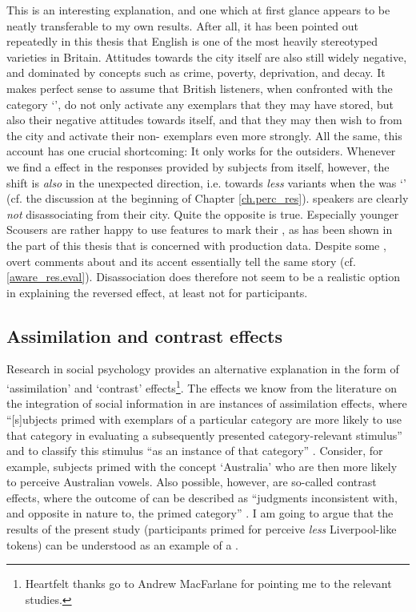 This is an interesting explanation, and one which at first glance appears to be neatly transferable to my own results.
After all, it has been pointed out repeatedly in this thesis that  English is one of the most heavily stereotyped varieties in Britain.
Attitudes towards the city itself are also still widely negative, and dominated by concepts such as crime, poverty, deprivation, and decay.
It makes perfect sense to assume that British listeners, when confronted with the category `', do not only activate any  exemplars that they may have stored, but also their negative attitudes towards  itself, and that they may then wish to  from the city and activate their non- exemplars even more strongly.
All the same, this account has one crucial shortcoming: It only works for the outsiders.
Whenever we find a  effect in the responses provided by subjects from  itself, however, the shift is \emph{also} in the unexpected direction, i.e. towards \emph{less}  variants when the  was `' (cf. the discussion at the beginning of Chapter \ref{ch.perc_res}).
 speakers are clearly \emph{not} disassociating from their city.
Quite the opposite is true.
Especially younger Scousers are rather happy to use  features to mark their , as has been shown in the part of this thesis that is concerned with production data.
Despite some , overt comments about  and its accent essentially tell the same story (cf. \ref{aware_res.eval}).
Disassociation does therefore not seem to be a realistic option in explaining the reversed  effect, at least not for  participants.

		\subsection{Assimilation and contrast effects}

Research in social psychology provides an alternative explanation in the form of `assimilation' and `contrast' effects\footnote{Heartfelt thanks go to Andrew MacFarlane for pointing me to the relevant studies.}.
The  effects we know from the literature on the integration of social information in  are instances of assimilation effects, where ``[s]ubjects primed with exemplars of a particular category are more likely to use that category in evaluating a subsequently presented category-relevant stimulus'' and to classify this stimulus ``as an instance of that category'' \parencite[1106--1107]{herr1986}.
Consider, for example, subjects primed with the concept `Australia' who are then more likely to perceive Australian vowels.
Also possible, however, are so-called contrast effects, where the outcome of  can be described as ``judgments inconsistent with, and opposite in nature to, the primed category'' \parencite[1107]{herr1986}.
I am going to argue that the results of the present study (participants primed for  perceive \emph{less} Liverpool-like tokens) can be understood as an example of a .


